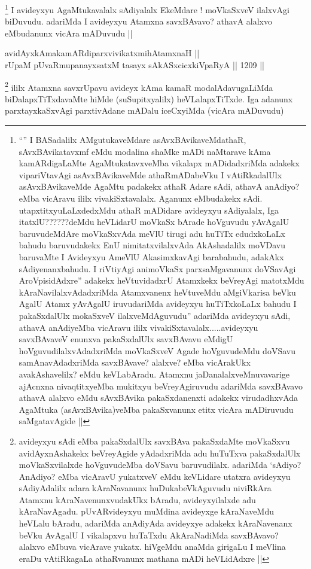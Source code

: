 \begin{artha}
\footnote{``\stext'' I BASadalilx AMgutukaveMdare asAvxBAvikaveMdathaR, sAvxBAvikatavxmf eMdu modalina shaMke mADi naMtarave kAma kamARdigaLaMte AgaMtukatavxveMba vikalapx mADidadxriMda adakekx vipariVtavAgi asAvxBAvikaveMde athaRmADabeVku I vAtiRkadalUlx asAvxBAvikaveMde AgaMtu padakekx athaR Adare sAdi, athavA anAdiyo? eMba vicAravu ililx vivakiSxtavalalx. Aganunx eMbudakekx sAdi. utapxtitxyuLaLxdedxMdu athaR mADidare avideyxyu sAdiyalalx, Iga itatxlU??????deMdu heVLidarU moVkaSx bArade hoVguvudu yAvAgalU baruvudeMdAre moVkaSxvAda meVlU tirugi adu huTiTx edudxkoLaLx bahudu baruvudakekx EnU nimitatxvilalxvAda AkAshadalilx moVDavu baruvaMte I Avideyxyu AmeVlU AkasimxkavAgi barabahudu, adakAkx sAdiyenanxbahudu. I riVtiyAgi animoVkaSx parxsaMgavanunx doVSavAgi AroVpisidAdxre'' adakekx heVtuvidadxrU Atamxkekx beVreyAgi matotxMdu kAraNavilalxvAdadxriMda Atamxvanenx heVtuveMdu aMgiVkarisa beVku AgalU Atamx yAvAgalU iruvudariMda avideyxyu huTiTxkoLaLx bahudu I pakaSxdalUlx mokaSxveV ilalxveMdAguvudu'' adariMda avideyxyu sAdi, athavA anAdiyeMba vicAravu ililx vivakiSxtavalalx.....avideyxyu savxBAvaveV enunxva pakaSxdalUlx savxBAvavu eMdigU hoVguvudilalxvAdadxriMda moVkaSxveV Agade hoVguvudeMdu doVSavu samAnavAdadxriMda savxBAvave? alalxve? eMba vicArakUkx avakAshavelilx? eMdu keVLabAradu. Atamxnu jaDanalalxveMnuvavarige ajAcnxna nivaqtitxyeMba mukitxyu beVreyAgiruvudu adariMda savxBAvavo athavA alalxvo eMdu sAvxBAvika pakaSxdanenxti adakekx virudadhxvAda AgaMtuka (asAvxBAvika)veMba pakaSxvanunx etitx vicAra mADiruvudu saMgatavAgide ||} 
I avideyxyu AgaMtukavalalx sAdiyalalx EkeMdare ! moVkaSxveV ilalxvAgi biDuvudu. adariMda I avideyxyu Atamxna savxBAvavo? athavA alalxvo eMbudanunx vicAra mADuvudu ||
\end{artha}


\begin{shl}
avidAyxkAmakamARdiparxvivikatxmihA\s \s tamxnaH || \\
rUpaM pUvaRmupanayxsatxM tasayx sAkASxcicxkiVpaRyA ||  1209 ||  
\end{shl}

\begin{artha}
\footnote{avideyxyu sAdi eMba pakaSxdalUlx savxBAva pakaSxdaMte moVkaSxvu avidAyxnAshakekx beVreyAgide yAdadxriMda adu huTuTxva pakaSxdalUlx moVkaSxvilalxde hoVguvudeMba doVSavu baruvudilalx. adariMda `sAdiyo? AnAdiyo? eMba vicAravU yukatxveV eMdu keVLidare utatxra avideyxyu sAdiyAdalilx adara kAraNavanunx huDukabeVkAguvudu niviRkAra Atamxnu kAraNavenunxvudakUkx bAradu, avideyxyilalxde adu kAraNavAgadu. pUvARvideyxyu muMdina avideyxge kAraNaveMdu heVLalu bAradu, adariMda anAdiyAda avideyxye adakekx kAraNavenanx beVku AvAgalU I vikalapxvu huTaTxdu AkAraNadiMda savxBAvavo? alalxvo eMbuva vicArave yukatx. hiVgeMdu anaMda girigaLu I meVlina eraDu vAtiRkagaLa athaRvanunx mathana mADi heVLidAdxre ||}
ililx Atamxna savxrUpavu avideyx kAma kamaR modalAdavugaLiMda biDalapxTiTxdavaMte hiMde (suSupitxyalilx) heVLalapxTiTxde. Iga adanunx parxtayxkaSxvAgi parxtivAdane mADalu iceCxyiMda (vicAra mADuvudu)
\end{artha}


